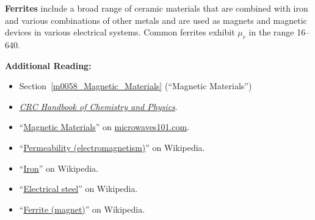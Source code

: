 {\bf Ferrites} 
include a broad range of ceramic materials that are combined with iron and various combinations of other metals and are used as magnets and magnetic devices in various  electrical systems. Common ferrites exhibit $\mu_r$ in the range 16--640.


{\bf Additional Reading:}
\begin{itemize}
\item Section~\ref{m0058_Magnetic_Materials} (``Magnetic Materials'')
\item \href{http://hbcponline.com}{\emph{CRC Handbook of Chemistry and Physics}}.
\item ``\href{https://www.microwaves101.com/encyclopedias/magnetic-materials}{Magnetic Materials}'' on \href{http://www.microwaves101.com}{microwaves101.com}.
\item ``\href{https://en.wikipedia.org/wiki/Permeability_(electromagnetism)}{Permeability (electromagnetism)}'' on Wikipedia.
\item ``\href{https://en.wikipedia.org/wiki/Iron}{Iron}'' on Wikipedia.
\item ``\href{https://en.wikipedia.org/wiki/Electrical_steel}{Electrical steel}'' on Wikipedia.
\item ``\href{https://en.wikipedia.org/wiki/Ferrite_(magnet)}{Ferrite (magnet)}'' on Wikipedia.
\end{itemize}

